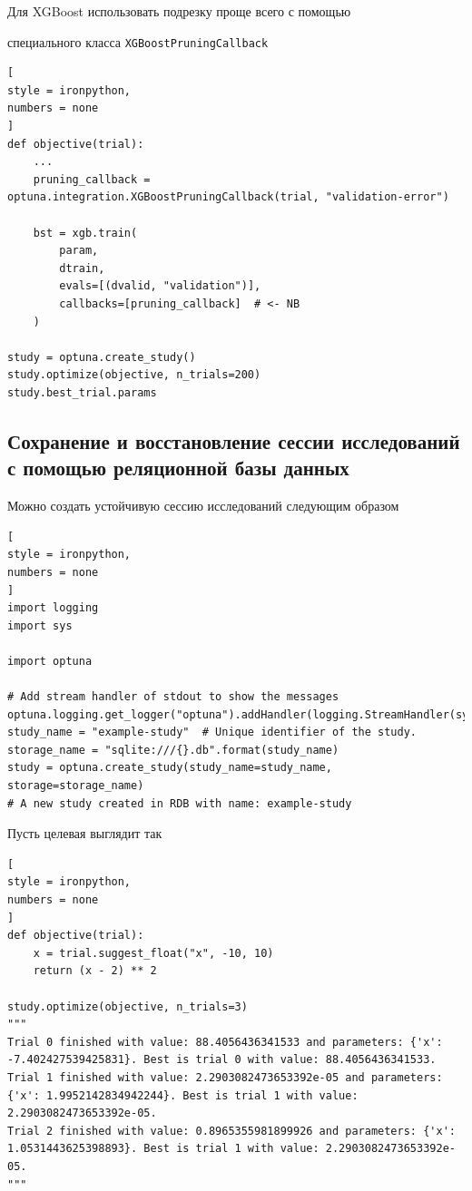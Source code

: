 \documentclass[%
	11pt,
	a4paper,
	utf8,
		]{article}
\begin{document}
Для XGBoost использовать подрезку проще всего с помощью 

специального класса \verb|XGBoostPruningCallback|
\begin{lstlisting}[
style = ironpython,
numbers = none
]
def objective(trial):
    ...
	pruning_callback = optuna.integration.XGBoostPruningCallback(trial, "validation-error")
	
	bst = xgb.train(
	    param,
	    dtrain,
	    evals=[(dvalid, "validation")],
	    callbacks=[pruning_callback]  # <- NB
	)
	
study = optuna.create_study()
study.optimize(objective, n_trials=200)
study.best_trial.params
\end{lstlisting}

\subsection{Сохранение и восстановление сессии исследований с помощью реляционной базы данных}

Можно создать устойчивую сессию исследований следующим образом
\begin{lstlisting}[
style = ironpython,
numbers = none
]
import logging
import sys

import optuna

# Add stream handler of stdout to show the messages
optuna.logging.get_logger("optuna").addHandler(logging.StreamHandler(sys.stdout))
study_name = "example-study"  # Unique identifier of the study.
storage_name = "sqlite:///{}.db".format(study_name)
study = optuna.create_study(study_name=study_name, storage=storage_name)
# A new study created in RDB with name: example-study
\end{lstlisting}

Пусть целевая выглядит так
\begin{lstlisting}[
style = ironpython,
numbers = none
]
def objective(trial):
	x = trial.suggest_float("x", -10, 10)
	return (x - 2) ** 2

study.optimize(objective, n_trials=3)
"""
Trial 0 finished with value: 88.4056436341533 and parameters: {'x': -7.402427539425831}. Best is trial 0 with value: 88.4056436341533.
Trial 1 finished with value: 2.2903082473653392e-05 and parameters: {'x': 1.9952142834942244}. Best is trial 1 with value: 2.2903082473653392e-05.
Trial 2 finished with value: 0.8965355981899926 and parameters: {'x': 1.0531443625398893}. Best is trial 1 with value: 2.2903082473653392e-05.
"""
\end{lstlisting}
\end{document}
